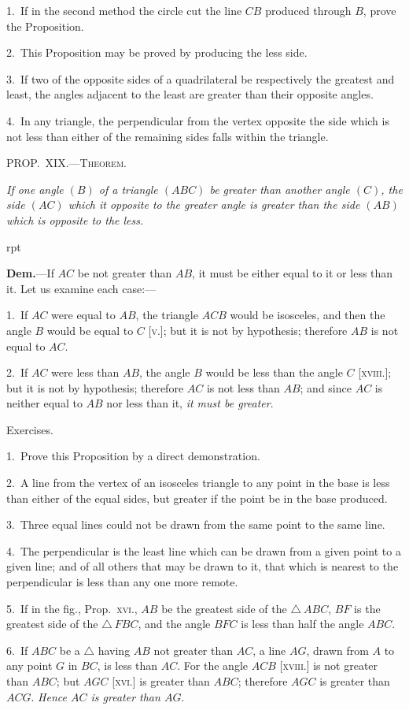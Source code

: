 \documentclass[oneside]{book}
\newcommand\mypropl[2]{
\bigskip\Needspace*{4\baselineskip}\begin{center}\textsc{#1}\end{center}
\hspace{\parindent}\emph{#2}\par\medskip
}
\newcommand\exhead[1]{
\Needspace*{5\baselineskip}\begin{center}
\textsf{#1}
\end{center}
}
\newcommand\imgflow[3]{
\setcounter{wrapwidth}{#1}
\begin{wrapfigure}[#2]{r}{\value{wrapwidth}pt}
\begin{center}
\vspace{-0.3in}
\end{center}
\end{wrapfigure}
}
\begin{document}
\begin{footnotesize}
1.~If in the second method the circle cut the line $CB$ produced
through $B$, prove the Proposition.

2.~This Proposition may be proved by producing the less side.

3.~If two of the opposite sides of a quadrilateral be respectively
the greatest and least, the angles adjacent to the least are greater
than their opposite angles.

4.~In any triangle, the perpendicular from the vertex opposite
the side which is not less than either of the remaining sides falls
within the triangle.
\par\end{footnotesize}


\mypropl{PROP\@.~XIX\@.---Theorem.}{If one angle $(B)$ of a triangle $(ABC)$ be greater than
another angle $(C)$, the side $(AC)$ which it opposite to the
greater angle is greater than the side $(AB)$ which is opposite
to the less.}

\imgflow{115}{8}{f035}

\textbf{Dem.}---If $AC$ be not greater than $AB$, it must be
either equal to it or less than it.
Let us examine each case:---

1.~If $AC$ were equal to $AB$,
the triangle $ACB$ would be
isosceles, and then the angle $B$
would be equal to $C$ [\textsc{v}.]; but it
is not by hypothesis; therefore
$AB$ is not equal to $AC$.

2.~If $AC$ were less than $AB$, the angle $B$ would be
less than the angle $C$ [\textsc{xviii}.]; but it is not by hypothesis;
therefore $AC$ is not less than $AB$; and since $AC$ is
neither equal to $AB$ nor less than it, \emph{it must be greater}.

\exhead{Exercises.}

\begin{footnotesize}
1.~Prove this Proposition by a direct demonstration.

2.~A line from the vertex of an isosceles triangle to any point
in the base is less than either of the equal sides, but greater if the
point be in the base produced.

3.~Three equal lines could not be drawn from the same point
to the same line.

4.~The perpendicular is the least line which can be drawn from
a given point to a given line; and of all others that may be
drawn to it, that which is nearest to the perpendicular is less
than any one more remote.

5.~If in the fig., Prop.~\textsc{xvi}., $AB$ be the greatest side of the
$\triangle~ABC$, $BF$ is the greatest side of the $\triangle~FBC$, and the angle $BFC$
is less than half the angle $ABC$.

6.~If $ABC$ be a $\triangle$ having $AB$ not greater than $AC$, a line $AG$,
drawn from $A$ to any point $G$ in $BC$, is less than $AC$. For the
angle $ACB$ [\textsc{xviii}.] is not greater than $ABC$; but $AGC$ [\textsc{xvi}.] is
greater than $ABC$; therefore $AGC$ is greater than $ACG$. \emph{Hence
$AC$ is greater than $AG$}.
\par\end{footnotesize}
\end{document}
